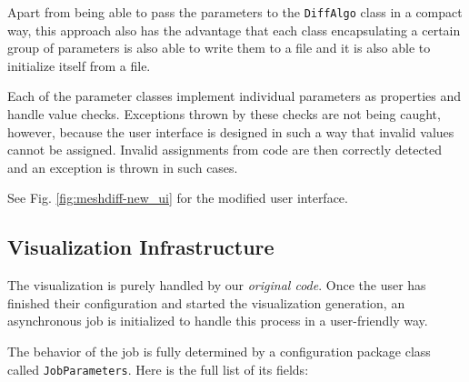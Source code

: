 Apart from being able to pass the parameters to the \verb+DiffAlgo+ class in a compact way, this approach also has the advantage that each class encapsulating a certain group of parameters is also able to write them to a file and it is also able to initialize itself from a file\footnotemark.


Each of the parameter classes implement individual parameters as properties and handle value checks. Exceptions thrown by these checks are not being caught, however, because the user interface is designed in such a way that invalid values cannot be assigned. Invalid assignments from code are then correctly detected and an exception is thrown in such cases.

See Fig. \ref{fig:meshdiff-new_ui} for the modified user interface.
\subsection{Visualization Infrastructure}
\label{subsec:implementation-architecture-infrastructure}

The visualization is purely handled by our {\it original code}. Once the user has finished their configuration and started the visualization generation, an asynchronous job is initialized to handle this process in a user-friendly way.

The behavior of the job is fully determined by a configuration package class called \verb+JobParameters+. Here is the full list of its fields:

